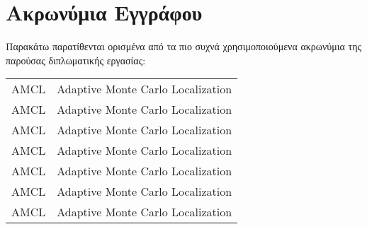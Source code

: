 \chapter*{Ακρωνύμια Εγγράφου}
\label{append:acronyms}
{}

Παρακάτω παρατίθενται ορισμένα από τα πιο συχνά χρησιμοποιούμενα ακρωνύμια της
παρούσας διπλωματικής εργασίας:

\begin{table}[htpb]
  \centering
  \begin{tabular}{l@{$\;\;\longrightarrow\;\;$}l}
    AMCL & Adaptive Monte Carlo Localization \\
    AMCL & Adaptive Monte Carlo Localization \\
    AMCL & Adaptive Monte Carlo Localization \\
    AMCL & Adaptive Monte Carlo Localization \\
    AMCL & Adaptive Monte Carlo Localization \\
    AMCL & Adaptive Monte Carlo Localization \\
    AMCL & Adaptive Monte Carlo Localization \\
    

  \end{tabular}
\end{table}
